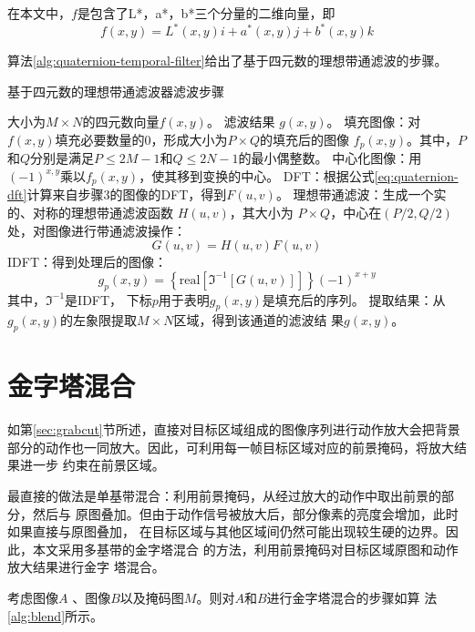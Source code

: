 在本文中，$f$是包含了L*，a*，b*三个分量的二维向量，即
\begin{equation}
  \label{eq:quaternion-lab}
  f(x,y)=L^{*}(x,y)i+a^{*}(x,y)j+b^{*}(x,y)k
\end{equation}

算法\ref{alg:quaternion-temporal-filter}给出了基于四元数的理想带通滤波的步骤。

\begin{algorithm}[htbp]
  \caption{基于四元数的理想带通滤波器滤波步骤}
  \label{alg:quaternion-temporal-filter}
  \begin{algorithmic}[1]
    \REQUIRE 大小为$M\times N$的四元数向量$f(x,y)$。
    \ENSURE 滤波结果 $g(x,y)$。
    \STATE 填充图像：对$f(x,y)$填充必要数量的0，形成大小为$P\times Q$的填充后的图像
    $f_{p}(x,y)$。其中，$P$和$Q$分别是满足$P\le 2M-1$和$Q\le 2N-1$的最小偶整数。
    \STATE 中心化图像：用$(-1)^{x,y}$乘以$f_{p}(x,y)$，使其移到变换的中心。
    \STATE DFT：根据公式\ref{eq:quaternion-dft}计算来自步骤3的图像的DFT，得到$F(u,v)$。
    \STATE 理想带通滤波：生成一个实的、对称的理想带通滤波函数 $H(u,v)$，其大小为
    $P\times Q$，中心在$(P/2, Q/2)$处，对图像进行带通滤波操作：$$G(u,v)=H(u,v)F(u,v)$$
    \STATE IDFT：得到处理后的图像：$$g_p(x,y)=\left\{
      \mbox{real}[\Im^{-1}[G(u,v)]] \right\}(-1)^{x+y}$$ 其中，$\Im^{-1}$是IDFT，
    下标$p$用于表明$g_p(x,y)$是填充后的序列。
    \STATE 提取结果：从$g_p(x,y)$的左象限提取$M\times N$区域，得到该通道的滤波结
    果$g(x,y)$。
  \end{algorithmic}
\end{algorithm}


\section{金字塔混合}
\label{sec:pyramid-blending}

如第\ref{sec:grabcut}节所述，直接对目标区域组成的图像序列进行动作放大会把背景
部分的动作也一同放大。因此，可利用每一帧目标区域对应的前景掩码，将放大结果进一步
约束在前景区域。

最直接的做法是单基带混合：利用前景掩码，从经过放大的动作中取出前景的部分，然后与
原图叠加。但由于动作信号被放大后，部分像素的亮度会增加，此时如果直接与原图叠加，
在目标区域与其他区域间仍然可能出现较生硬的边界。因此，本文采用多基带的金字塔混合
的方法，利用前景掩码对目标区域原图和动作放大结果进行金字
塔混合。

考虑图像$A$ 、图像$B$以及掩码图$M$。则对$A$和$B$进行金字塔混合的步骤如算
法\ref{alg:blend}所示。

